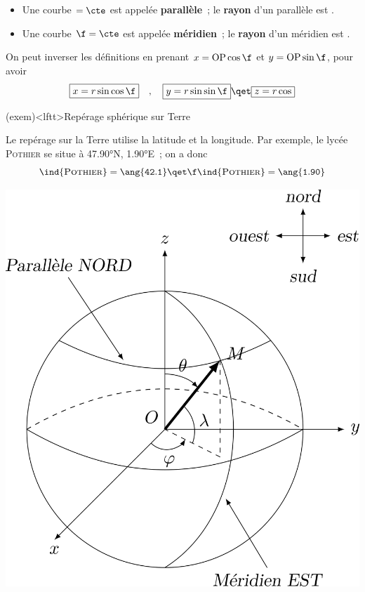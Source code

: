\documentclass[../../main/main.tex]{subfiles}
\begin{document}
\begin{itemize}
	\item Une courbe $\tt = \cte$ est appelée \textbf{parallèle}~; le
	      \textbf{rayon} d'un parallèle est .
	\item Une courbe $\f = \cte$ est appelée \textbf{méridien}~; le
	      \textbf{rayon} d'un méridien est .
\end{itemize}

On peut inverser les définitions en prenant $x = {\rm OP}\cos\f$ et $y = {\rm
	OP}\sin\f$, pour avoir
\[
	\boxed{x = r\sin\tt\cos\f}
	\quad,\quad
	\boxed{y = r\sin\tt\sin\f}
	\qet
	\boxed{z = r\cos\tt}
\]

\begin{tcb*}(exem)<lftt>{Repérage sphérique sur Terre}
	\begin{minipage}{0.70\linewidth}
		Le repérage sur la Terre utilise la latitude et la longitude. Par
		exemple, le lycée \textsc{Pothier} se situe à \ang{47.90}N,
		\ang{1.90;;}E~; on a donc
		\[
			\tt\ind{\textsc{Pothier}} = \ang{42.1}
			\qet
			\f\ind{\textsc{Pothier}} = \ang{1.90}
		\]
	\end{minipage}
	\hfill
	\begin{minipage}{0.25\linewidth}
		\begin{center}
			\includegraphics[width=\linewidth]{sph_terre}
		\end{center}
	\end{minipage}
\end{tcb*}
\end{document}
